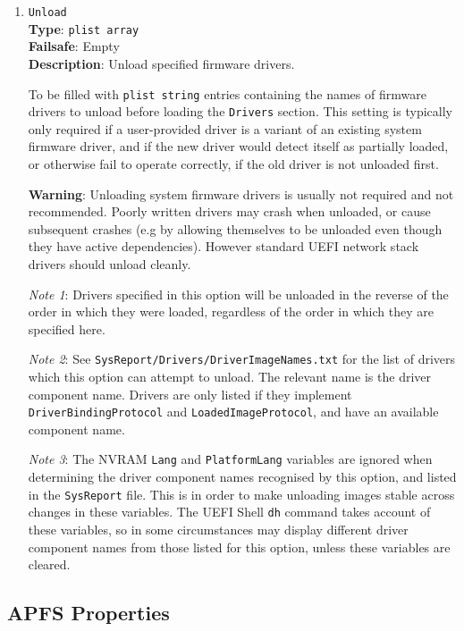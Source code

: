 \documentclass[]{article}
\makeatletter
\renewcommand{\label}[1]{%
\zref@wrapper@immediate{\oldlabel{#1}}}  %
\makeatother
\begin{document}
\begin{enumerate}
\item
  \texttt{Unload}\\
  \textbf{Type}: \texttt{plist\ array}\\
  \textbf{Failsafe}: Empty\\
  \textbf{Description}: Unload specified firmware drivers.

  To be filled with \texttt{plist\ string} entries containing
  the names of firmware drivers to unload before loading the
  \texttt{Drivers} section.
  This setting is typically only required if a user-provided driver is a variant of
  an existing system firmware driver, and if the new driver would detect itself
  as partially loaded, or otherwise fail to operate correctly, if the old
  driver is not unloaded first.

  \textbf{Warning}: Unloading system firmware drivers is usually not required
  and not recommended. Poorly written drivers may crash when
  unloaded, or cause subsequent crashes (e.g by allowing themselves to be
  unloaded even though they have active dependencies). However standard UEFI
  network stack drivers should unload cleanly.

  \emph{Note 1}: Drivers specified in this option will be unloaded in the reverse
  of the order in which they were loaded, regardless of the order in which they
  are specified here.

  \emph{Note 2}: See \texttt{SysReport/Drivers/DriverImageNames.txt} for the
  list of drivers which this option can attempt to unload.
  The relevant name is the driver component name. Drivers are only listed if they
  implement \texttt{DriverBindingProtocol} and \texttt{LoadedImageProtocol},
  and have an available component name.

  \emph{Note 3}: The NVRAM \texttt{Lang} and \texttt{PlatformLang} variables
  are ignored when determining the driver component names recognised by this
  option, and listed in the \texttt{SysReport} file. This is in order to make
  unloading images stable across changes in these variables.
  The UEFI Shell \texttt{dh} command takes account of these variables,
  so in some circumstances may display different driver component names from
  those listed for this option, unless these variables are cleared.

\end{enumerate}

\subsection{APFS Properties}\label{uefiapfsprops}
\end{document}
